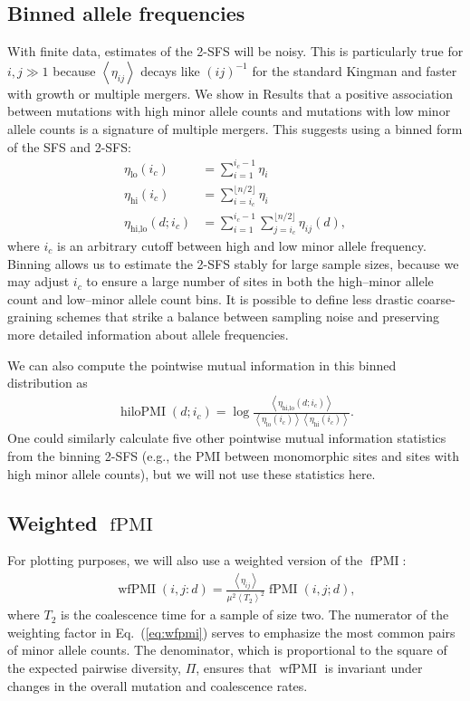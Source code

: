 \documentclass[11pt, letterpaper]{article}   	%
\newcommand{\eq}[1]{Eq.~(\ref{#1})}
\newcommand{\floor}[1]{\lfloor #1 \rfloor}
\newcommand{\E}[1]{\left< #1 \right>}
\DeclareMathOperator{\fpmi}{fPMI}
\DeclareMathOperator{\wfpmi}{wfPMI}
\DeclareMathOperator{\hilopmi}{hiloPMI}
\begin{document}
\subsection*{Binned allele frequencies}

With finite data, estimates of the 2-SFS will be noisy.
This is particularly true for $i,j\gg1$ because $\E{\eta_{ij}}$ decays like $(ij)^{-1}$ for the standard Kingman \autocite{Fu1995} and faster with growth or multiple mergers.
We show in Results that a positive association between mutations with high minor allele counts and mutations with low minor allele counts is a signature of multiple mergers.
This suggests using a binned form of the SFS and 2-SFS:
\begin{align}
    \eta_{\text{lo}}(i_c) &= \sum_{i=1}^{i_c-1} \eta_i \\
    \eta_{\text{hi}}(i_c) &= \sum_{i=i_c}^{\floor{n/2}} \eta_i \\
    \eta_{\text{hi,lo}}(d; i_c) &= \sum_{i=1}^{i_c-1} \sum_{j=i_c}^{\floor{n/2}} \eta_{ij}(d),
\end{align}
where $i_c$ is an arbitrary cutoff between high and low minor allele frequency.
Binning allows us to estimate the 2-SFS stably for large sample sizes, because we may adjust $i_c$ to ensure a large number of sites in both the high--minor allele count and low--minor allele count bins.
It is possible to define less drastic coarse-graining schemes that strike a balance between sampling noise and preserving more detailed information about allele frequencies.

We can also compute the pointwise mutual information in this binned distribution as
\begin{align}
    \hilopmi(d; i_c) = \log \frac
                                {\E{\eta_{\text{hi,lo}}(d; i_c)}}
                                {\E{\eta_{\text{lo}}(i_c)}  \E{\eta_{\text{hi}}(i_c)}}.
\end{align}
One could similarly calculate five other pointwise mutual information statistics from the binning 2-SFS (e.g., the PMI between monomorphic sites and sites with high minor allele counts), but we will not use these statistics here.


\subsection*{Weighted $\fpmi$}
For plotting purposes, we will also use a weighted version of the $\fpmi$:
\begin{align}
    \wfpmi(i,j:d) = \frac{\E{\eta_{ij}}}{\mu^2 \E{T_2}^2} \fpmi(i,j;d),
    \label{eq:wfpmi}
\end{align}
where $T_2$ is the coalescence time for a sample of size two.
The numerator of the weighting factor in \eq{eq:wfpmi} serves to emphasize the most common pairs of minor allele counts.
The denominator, which is proportional to the square of the expected pairwise diversity, $\Pi$, ensures that $\wfpmi$ is invariant under changes in the overall mutation and coalescence rates.
\end{document}
